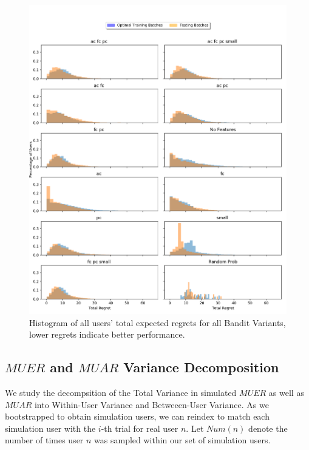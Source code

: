 \begin{figure}[H]
\includegraphics[width=1.3\textwidth,center]{figures/totalregrethists.png}%
\caption{Histogram of all users' total expected regrets for all Bandit Variants, lower regrets indicate better performance.}
\label{Histogram of all Users' Total Regrets for all Bandit Variants}
\end{figure}

\clearpage

\subsection{$MUER$ and $MUAR$ Variance Decomposition}
\label{Variance Decomposition}

We study the decompsition of the Total Variance in simulated $MUER$ as well as $MUAR$ into Within-User Variance and Betweeen-User Variance.  As we bootstrapped to obtain simulation users, we can reindex to match each simulation user with the $i$-th trial for real user $n$.  Let $Num(n)$ denote the number of times user $n$ was sampled within our set of simulation users.

